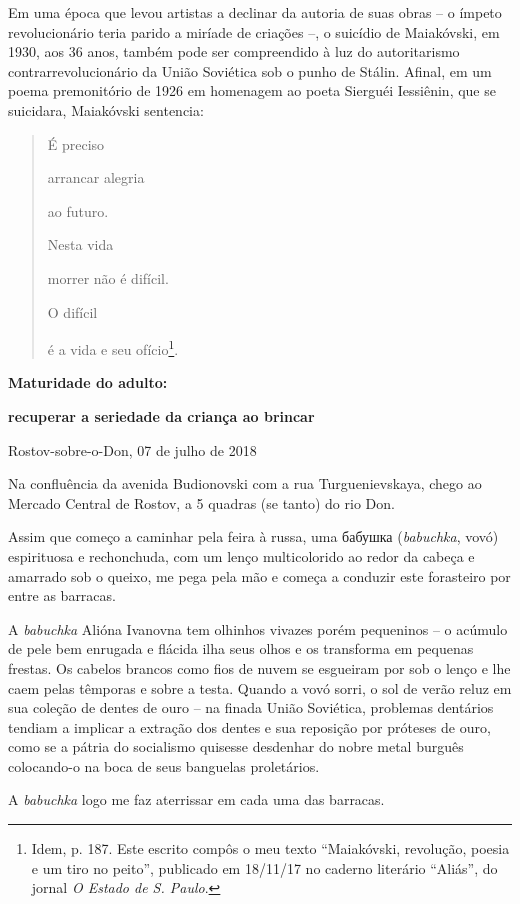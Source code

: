 Em uma época que levou artistas a declinar da autoria de suas obras -- o
ímpeto revolucionário teria parido a miríade de criações --, o suicídio
de Maiakóvski, em 1930, aos 36 anos, também pode ser compreendido à luz
do autoritarismo contrarrevolucionário da União Soviética sob o punho de
Stálin. Afinal, em um poema premonitório de 1926 em homenagem ao poeta
Sierguéi Iessiênin, que se suicidara, Maiakóvski sentencia:

\begin{quote}
É preciso

arrancar alegria

ao futuro.

Nesta vida

morrer não é difícil.

O difícil

é a vida e seu ofício\footnote{Idem, p. 187. Este escrito compôs o meu
  texto ``Maiakóvski, revolução, poesia e um tiro no peito'', publicado
  em 18/11/17 no caderno literário ``Aliás'', do jornal \emph{O Estado
  de S. Paulo}.}.
\end{quote}

\textbf{Maturidade do adulto: }

\textbf{recuperar a seriedade da criança ao brincar}

Rostov-sobre-o-Don, 07 de julho de 2018

Na confluência da avenida Budionovski com a rua Turguenievskaya, chego
ao Mercado Central de Rostov, a 5 quadras (se tanto) do rio Don.

Assim que começo a caminhar pela feira à russa, uma бабушка
(\emph{babuchka}, vovó) espirituosa e rechonchuda, com um lenço
multicolorido ao redor da cabeça e amarrado sob o queixo, me pega pela
mão e começa a conduzir este forasteiro por entre as barracas.

A \emph{babuchka} Alióna Ivanovna tem olhinhos vivazes porém pequeninos
-- o acúmulo de pele bem enrugada e flácida ilha seus olhos e os
transforma em pequenas frestas. Os cabelos brancos como fios de nuvem se
esgueiram por sob o lenço e lhe caem pelas têmporas e sobre a testa.
Quando a vovó sorri, o sol de verão reluz em sua coleção de dentes de
ouro -- na finada União Soviética, problemas dentários tendiam a
implicar a extração dos dentes e sua reposição por próteses de ouro,
como se a pátria do socialismo quisesse desdenhar do nobre metal burguês
colocando-o na boca de seus banguelas proletários.

A \emph{babuchka} logo me faz aterrissar em cada uma das barracas.

